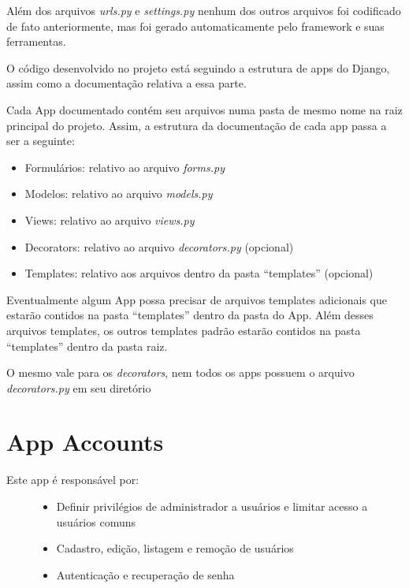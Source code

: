 \documentclass[letterpaper,10pt,brazil]{sphinxmanual}
\begin{document}
Além dos arquivos \emph{urls.py} e \emph{settings.py} nenhum dos outros arquivos foi codificado de fato anteriormente, mas foi gerado automaticamente pelo framework e suas ferramentas.

O código desenvolvido no projeto está seguindo a estrutura de apps do Django, assim como a documentação relativa a essa parte.

Cada App documentado contém seu arquivos numa pasta de mesmo nome na raiz principal do projeto. Assim, a estrutura da documentação de cada app passa a ser a seguinte:
\begin{itemize}
\item {} 
Formulários: relativo ao arquivo \emph{forms.py}

\item {} 
Modelos: relativo ao arquivo \emph{models.py}

\item {} 
Views: relativo ao arquivo \emph{views.py}

\item {} 
Decorators: relativo ao arquivo \emph{decorators.py} (opcional)

\item {} 
Templates: relativo aos arquivos dentro da pasta ``templates'' (opcional)

\end{itemize}

Eventualmente algum App possa precisar de arquivos templates adicionais que estarão contidos na pasta ``templates'' dentro da pasta do App. Além desses arquivos templates, os outros templates padrão estarão contidos na pasta ``templates'' dentro da pasta raiz.

O mesmo vale para os \emph{decorators}, nem todos os apps possuem o arquivo \emph{decorators.py} em seu diretório


\section{App Accounts}
\label{apps/accounts:accounts}\label{apps/accounts:app-accounts}\label{apps/accounts::doc}\begin{description}
\item[{Este app é responsável por:}] \leavevmode\begin{itemize}
\item {} 
Definir privilégios de administrador a usuários e limitar acesso a usuários comuns

\item {} 
Cadastro, edição, listagem e remoção de usuários

\item {} 
Autenticação e recuperação de senha

\end{itemize}

\end{description}
\end{document}
